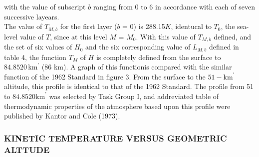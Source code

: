 \documentclass{article}
\begin{document}
with the value of subscript \(b\) ranging from 0 to 6 in accordance with each of seven successive layears.\\
The value of \(T_{M,b}\) for the first layer (\(b\) = 0) is 288.15\(K\), identucal to \(T_0\), the sea-level value of \(T\), since at this level \(M\) = \(M_0\). With this value of \(T_{M,b}\) defined, and the set of six values of \(H_0\) and the six corresponding value of \(L_{M,b}\) defined in table 4, the function \(T_M\) of \(H\) is completely defined from the surface to \(84.8520 \, \text{km}^{\prime}\) (86 km). A graph of this functionis compared with the similar function of the 1962 Standard in figure 3. From the surface to the \(51-\text{km}^\prime\) altitude, this profile is identical to that of the 1962 Standard. The profile from 51 to \(84.8520 \text{km}^\prime\) was selected by Task Group I, and addreviated table of thermodynamic properties of the atmosphere based upon this profile were published by Kantor and Cole (1973).

\subsubsection{KINETIC TEMPERATURE VERSUS GEOMETRIC ALTTUDE}
\end{document}
